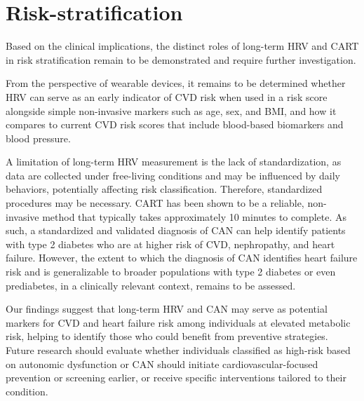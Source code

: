 \documentclass[
  a4paper,
  headsepline=true,
  open=any]{scrbook}
\begin{document}
\hypertarget{risk-stratification-1}{%
\section{Risk-stratification}\label{risk-stratification-1}}

Based on the clinical implications, the distinct roles of long-term HRV
and CART in risk stratification remain to be demonstrated and require
further investigation.

From the perspective of wearable devices, it remains to be determined
whether HRV can serve as an early indicator of CVD risk when used in a
risk score alongside simple non-invasive markers such as age, sex, and
BMI, and how it compares to current CVD risk scores that include
blood-based biomarkers and blood pressure.

A limitation of long-term HRV measurement is the lack of
standardization, as data are collected under free-living conditions and
may be influenced by daily behaviors, potentially affecting risk
classification. Therefore, standardized procedures may be necessary.
CART has been shown to be a reliable, non-invasive method that typically
takes approximately 10 minutes to complete. As such, a standardized and
validated diagnosis of CAN can help identify patients with type 2
diabetes who are at higher risk of CVD, nephropathy, and heart failure.
However, the extent to which the diagnosis of CAN identifies heart
failure risk and is generalizable to broader populations with type 2
diabetes or even prediabetes, in a clinically relevant context, remains
to be assessed.

Our findings suggest that long-term HRV and CAN may serve as potential
markers for CVD and heart failure risk among individuals at elevated
metabolic risk, helping to identify those who could benefit from
preventive strategies. Future research should evaluate whether
individuals classified as high-risk based on autonomic dysfunction or
CAN should initiate cardiovascular-focused prevention or screening
earlier, or receive specific interventions tailored to their condition.
\end{document}
